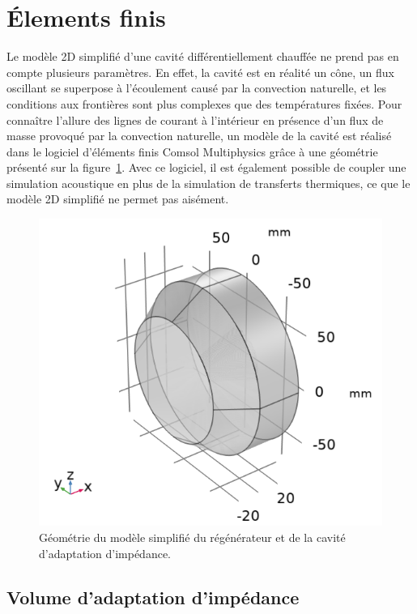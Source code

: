 \section{\'Elements finis}\label{chap:FEM}
Le modèle 2D simplifié d'une cavité différentiellement chauffée ne prend pas en compte plusieurs paramètres. En effet, la cavité est en réalité un cône, un flux oscillant se superpose à l'écoulement causé par la convection naturelle, et les conditions aux frontières sont plus complexes que des températures fixées. Pour connaître l'allure des lignes de courant à l'intérieur en présence d'un flux de masse provoqué par la convection naturelle, un modèle de la cavité est réalisé dans le logiciel d'éléments finis Comsol Multiphysics grâce à une géométrie présenté sur la figure~\ref{fig:Comsol_ModeleSimplifie_Geometrie}. Avec ce logiciel, il est également possible de coupler une simulation acoustique en plus de la simulation de transferts thermiques, ce que le modèle 2D simplifié ne permet pas aisément. 

\begin{figure}[!ht]
    \centering
    \includegraphics{../fig/fig_ConvNatComsol/Comsol_SimplifiedModel_Geometry5.png}
    \caption{Géométrie du modèle simplifié du régénérateur et de la cavité d'adaptation d'impédance.}
    \label{fig:Comsol_ModeleSimplifie_Geometrie}
\end{figure}

\subsection{Volume d'adaptation d'impédance}



